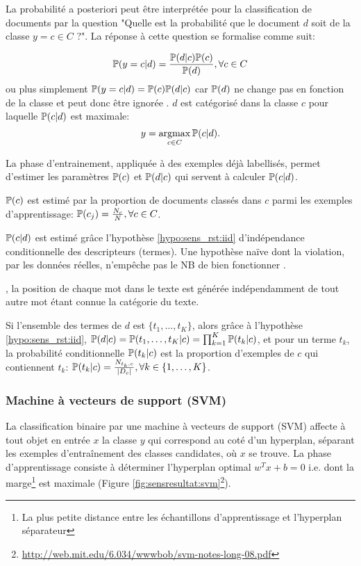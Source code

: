 La probabilité a posteriori peut être interprétée pour la classification de documents par la question "Quelle est la probabilité que le document $d$ soit de la classe $y=c \in C$ ?". La réponse à cette question se formalise comme suit:

\[\mathbb{P}(y=c \vert d) = \frac{\mathbb{P}(d \vert c)\mathbb{P}(c)}{\mathbb{P}(d)}, \forall c \in C \]
ou plus simplement  $\mathbb{P}(y = c \vert d) = \mathbb{P}(c)\mathbb{P}(d \vert c)$ car $\mathbb{P}(d)$ ne change pas en fonction de la classe et peut donc être ignorée \citep{rish2001nb_study}. $d$ est catégorisé dans la classe $c$ pour laquelle $\mathbb{P}(c \vert d)$ est maximale: \[y = \mathop{\mathrm{argmax}}\limits_{c \in C} \mathbb{P}(c \vert d).\]

 La phase d'entrainement, appliquée à des exemples déjà labellisés, permet d'estimer les paramètres $\mathbb{P}(c)$ et $\mathbb{P}(d \vert c)$ qui servent à calculer $\mathbb{P}(c \vert d)$.

$\mathbb{P}(c)$ est estimé par la proportion de documents classés dans $c$ parmi les exemples d'apprentissage: $\mathbb{P}(c_j) = \frac{N_c}{N}, \forall c \in C$.


 $\mathbb{P}(c \vert d)$ est estimé grâce l'hypothèse \ref{hypo:sens_rst:iid} d'{indépendance conditionnelle des descripteurs (termes)}. Une hypothèse naïve dont la violation, par les données réelles, n'empêche pas le NB de bien fonctionner \citep{rish2001nb_study}. 

\begin{hypothese}, la position de chaque mot dans le texte est générée indépendamment de tout autre mot étant connue la catégorie du texte. \label{hypo:sens_rst:iid}
\end{hypothese}

Si l'ensemble des termes de $d$ est $\lbrace t_{1}, \dots, t_{K} \rbrace$, alors grâce à l'hypothèse \ref{hypo:sens_rst:iid},
$\mathbb{P}(d \vert c) = \mathbb{P}(t_{1}, \dots, t_{K}\vert c) = \prod_{k=1}^K \mathbb{P}(t_{k} \vert c)$, et pour un terme $t_k$, la probabilité conditionnelle $\mathbb{P}(t_k \vert c)$ est la proportion d'exemples de $c$ qui contiennent $t_k$:  $\mathbb{P}(t_k \vert c) = \frac{N_{t_k,c}}{\vert D_c \vert }, \forall k \in \lbrace 1, \dots, K \rbrace$.

\subsubsection{Machine à vecteurs de support (SVM)}
\label{sec:sens-resultat:svm}
La classification binaire par une machine à vecteurs de support (SVM) \citep{vapnik1995statlearning} affecte à tout objet en entrée $x$ la classe $y$ qui correspond au coté d'un hyperplan, séparant les exemples d'entraînement des classes candidates, où $x$ se trouve. La phase d'apprentissage consiste à déterminer l'hyperplan optimal $w^T x + b = 0$ i.e. dont la marge\footnote{La plus petite distance entre les échantillons d'apprentissage et l'hyperplan séparateur} est maximale (Figure \ref{fig:sensresultat:svm}\footnote{\url{http://web.mit.edu/6.034/wwwbob/svm-notes-long-08.pdf}}).

